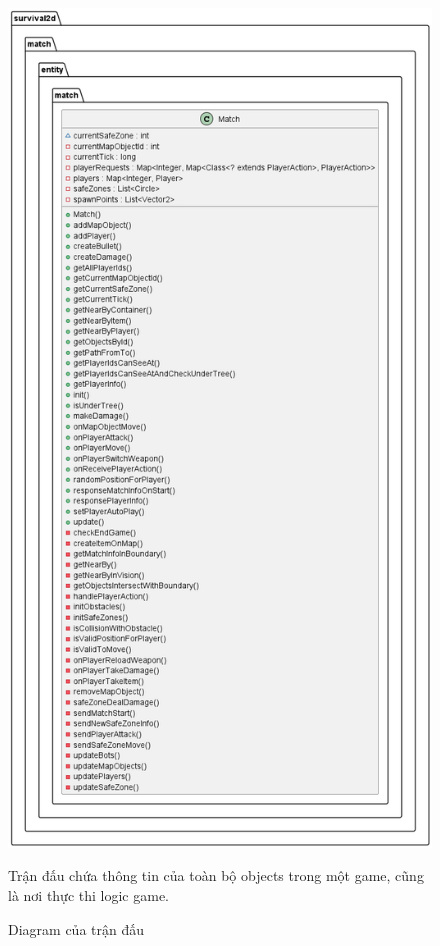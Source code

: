 \documentclass[12pt,a4paper]{article}
\begin{document}
  \begin{figure}[H]
    \centering
    \includegraphics[width=\textwidth,height=0.95\textheight,keepaspectratio]{Img/uml/match.png}
    \caption{Diagram của trận đấu}
    Trận đấu chứa thông tin của toàn bộ objects trong một game, cũng là nơi thực thi logic game.
  \end{figure}
\end{document}
